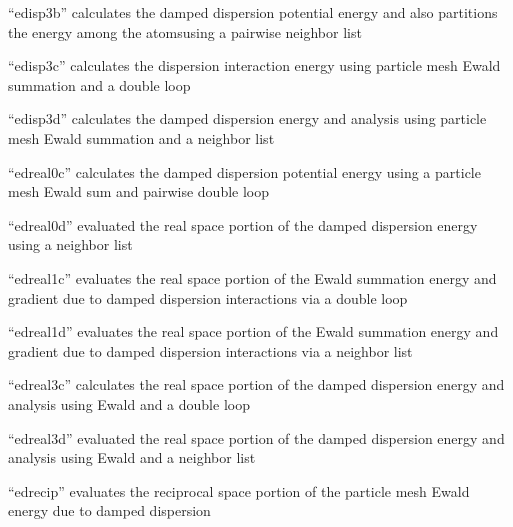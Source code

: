 \documentclass[letterpaper,11pt,english]{sphinxmanual}
\begin{document}
\sphinxAtStartPar
“edisp3b” calculates the damped dispersion potential energy and also partitions the energy among the atomsusing a pairwise neighbor list

\sphinxAtStartPar
{}

\sphinxAtStartPar
“edisp3c” calculates the dispersion interaction energy using particle mesh Ewald summation and a double loop

\sphinxAtStartPar
{}

\sphinxAtStartPar
“edisp3d” calculates the damped dispersion energy and analysis using particle mesh Ewald summation and a neighbor list

\sphinxAtStartPar
{}

\sphinxAtStartPar
“edreal0c” calculates the damped dispersion potential energy using a particle mesh Ewald sum and pairwise double loop

\sphinxAtStartPar
{}

\sphinxAtStartPar
“edreal0d” evaluated the real space portion of the damped dispersion energy using a neighbor list

\sphinxAtStartPar
{}

\sphinxAtStartPar
“edreal1c” evaluates the real space portion of the Ewald summation energy and gradient due to damped dispersion interactions via a double loop

\sphinxAtStartPar
{}

\sphinxAtStartPar
“edreal1d” evaluates the real space portion of the Ewald summation energy and gradient due to damped dispersion interactions via a neighbor list

\sphinxAtStartPar
{}

\sphinxAtStartPar
“edreal3c” calculates the real space portion of the damped dispersion energy and analysis using Ewald and a double loop

\sphinxAtStartPar
{}

\sphinxAtStartPar
“edreal3d” evaluated the real space portion of the damped dispersion energy and analysis using Ewald and a neighbor list

\sphinxAtStartPar
{}

\sphinxAtStartPar
“edrecip” evaluates the reciprocal space portion of the particle mesh Ewald energy due to damped dispersion
\end{document}

